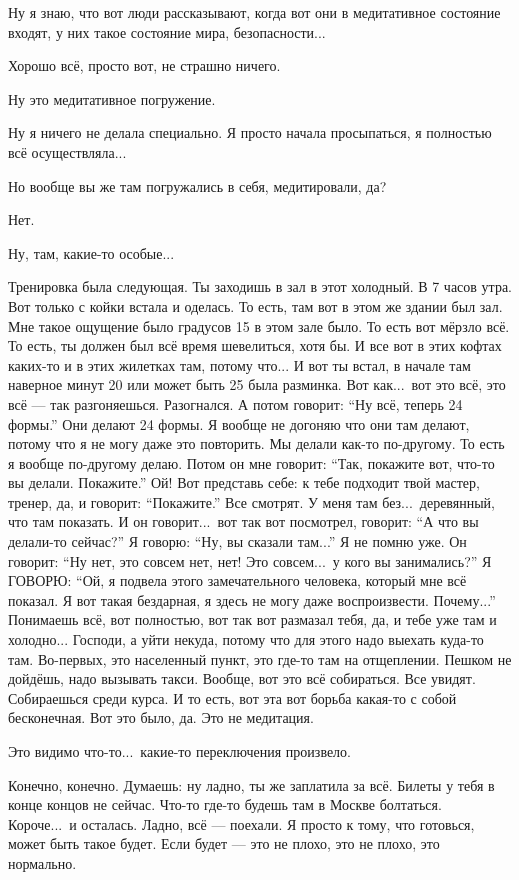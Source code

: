 \I
Ну я знаю, что вот люди рассказывают, когда вот они в
медитативное состояние входят,
у них такое состояние мира, безопасности...

\M
Хорошо всё, просто вот, не страшно ничего.

\I
Ну это медитативное погружение.

\M
Ну я ничего не делала специально. Я просто начала просыпаться, я полностью всё осуществляла...

\I
Но вообще вы же там погружались в себя, медитировали, да?

\M
Нет.

\I
Ну, там, какие-то особые...

\M
Тренировка была следующая. Ты заходишь
в зал в
этот холодный.
В 7 часов утра.
Вот только с койки встала и оделась.
То есть, там вот в этом же здании был зал.
Мне такое ощущение было градусов 15 в этом зале было.
То есть вот мёрзло всё.
То есть, ты должен был всё время шевелиться, хотя бы.
И все вот в этих кофтах каких-то и в этих жилетках там,
потому что... И вот ты встал, в начале там наверное минут 20 или может быть 25 была разминка.
Вот как...\ вот это всё, это всё --- так разгоняешься.
Разогнался. А потом говорит: ``Ну всё, теперь 24 формы.''
Они делают 24 формы. Я вообще не догоняю что они там делают,
потому что я не могу даже это повторить. Мы делали как-то по-другому.
То есть я вообще по-другому делаю.
Потом он мне говорит: ``Так, покажите вот, что-то вы делали. Покажите.''
Ой! Вот представь себе: к тебе подходит твой мастер, тренер, да, и говорит:
``Покажите.''
Все смотрят.
У меня там без...\ деревянный, что там показать.
И он говорит...\ вот так вот посмотрел, говорит: ``А что вы делали-то сейчас?''
Я говорю: ``Ну, вы сказали там...'' Я не помню уже.
Он говорит: ``Ну нет, это совсем нет, нет! Это совсем...\ у кого вы занимались?''
Я ГОВОРЮ: ``Ой, я подвела этого замечательного человека, который мне всё показал.
Я вот такая бездарная, я здесь не могу даже воспроизвести. Почему...''
Понимаешь всё, вот полностью, вот так вот размазал тебя, да, и тебе уже там и холодно...
Господи, а уйти некуда, потому что для этого надо выехать куда-то там.
Во-первых, это населенный пункт, это где-то там на отщеплении.
Пешком не дойдёшь, надо вызывать такси. Вообще, вот это всё собираться. Все увидят.
Собираешься среди курса. И то есть, вот эта вот борьба какая-то с собой бесконечная.
Вот это было, да. Это не медитация.

\I
Это видимо что-то...\ какие-то переключения произвело.

\M
Конечно, конечно.
Думаешь: ну ладно, ты же заплатила за всё.
Билеты у тебя в конце концов не сейчас.
Что-то где-то будешь там в Москве болтаться.
Короче...\ и осталась.
Ладно, всё --- поехали.
Я просто к тому, что готовься, может быть такое будет.
Если будет --- это не плохо, это не плохо, это нормально.

